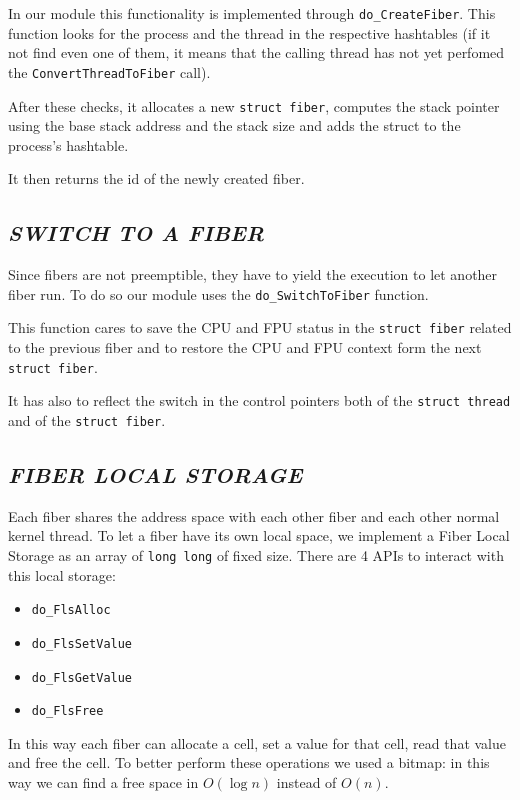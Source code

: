 \documentclass[a4paper]{article}
\begin{document}
In our module this functionality is implemented through \texttt{do\_CreateFiber}. This function looks for the process and the thread in the respective hashtables (if it not find even one of them, it means that the calling thread has not yet perfomed the \texttt{ConvertThreadToFiber} call).

After these checks, it allocates a new \texttt{struct fiber}, computes the stack pointer using the base stack address and the stack size and adds the struct to the process's hashtable.

It then returns the id of the newly created fiber.


\subsection*{\textit{SWITCH TO A FIBER}}
Since fibers are not preemptible, they have to yield the execution to let another fiber run. To do so our module uses the \texttt{do\_SwitchToFiber} function.

This function cares to save the CPU and FPU status in the \texttt{struct fiber} related to the previous fiber and to restore the CPU and FPU context form the next \texttt{struct fiber}.

It has also to reflect the switch in the control pointers both of the \texttt{struct thread} and of the \texttt{struct fiber}.

\subsection*{\textit{FIBER LOCAL STORAGE}}
Each fiber shares the address space with each other fiber and each other normal kernel thread. To let a fiber have its own local space, we implement a Fiber Local Storage as an array of \texttt{long long} of fixed size. There are 4 APIs to interact with this local storage:

\begin{itemize}
  \item \texttt{do\_FlsAlloc}
  \item \texttt{do\_FlsSetValue}
  \item \texttt{do\_FlsGetValue}
  \item \texttt{do\_FlsFree}
\end{itemize}

In this way each fiber can allocate a cell, set a value for that cell, read that value and free the cell.
To better perform these operations we used a bitmap: in this way we can find a free space in $O(\log n)$ instead of $O(n)$.
\end{document}
